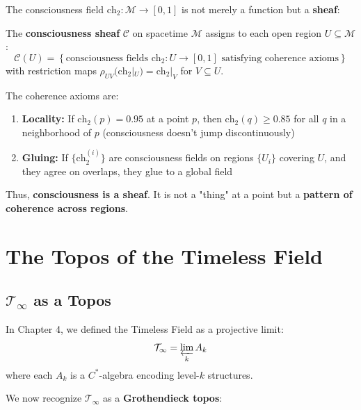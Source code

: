 The consciousness field $\text{ch}_2: \mathcal{M} \to [0, 1]$ is not merely a function but a \textbf{sheaf}:

\begin{definition}
\label{def:consciousness_sheaf}
The \textbf{consciousness sheaf} $\mathcal{C}$ on spacetime $\mathcal{M}$ assigns to each open region $U \subseteq \mathcal{M}$:
\begin{equation}
\mathcal{C}(U) = \left\{\text{consciousness fields } \text{ch}_2: U \to [0, 1] \text{ satisfying coherence axioms}\right\}
\end{equation}
with restriction maps $\rho_{UV}(\text{ch}_2|_U) = \text{ch}_2|_V$ for $V \subseteq U$.
\end{definition}

The coherence axioms are:
\begin{enumerate}
\item \textbf{Locality:} If $\text{ch}_2(p) = 0.95$ at a point $p$, then $\text{ch}_2(q) \geq 0.85$ for all $q$ in a neighborhood of $p$ (consciousness doesn't jump discontinuously)
\item \textbf{Gluing:} If $\{\text{ch}_2^{(i)}\}$ are consciousness fields on regions $\{U_i\}$ covering $U$, and they agree on overlaps, they glue to a global field
\end{enumerate}

Thus, \textbf{consciousness is a sheaf}. It is not a "thing" at a point but a \textbf{pattern of coherence across regions}.

\section{The Topos of the Timeless Field}

\subsection{\texorpdfstring{$\mathcal{T}_\infty$}{T\_infinity} as a Topos}

In Chapter 4, we defined the Timeless Field as a projective limit:
\begin{equation}
\mathcal{T}_\infty = \varprojlim_{k} A_k
\end{equation}
where each $A_k$ is a $C^*$-algebra encoding level-$k$ structures.

We now recognize $\mathcal{T}_\infty$ as a \textbf{Grothendieck topos}:

